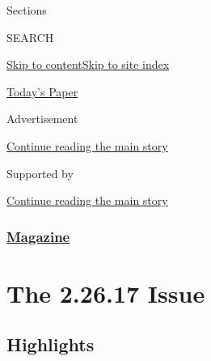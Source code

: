 Sections

SEARCH

\protect\hyperlink{site-content}{Skip to
content}\protect\hyperlink{site-index}{Skip to site index}

\href{https://myaccount.nytimes3xbfgragh.onion/auth/login?response_type=cookie\&client_id=vi}{}

\href{https://www.nytimes3xbfgragh.onion/section/todayspaper}{Today's
Paper}

Advertisement

\protect\hyperlink{after-top}{Continue reading the main story}

Supported by

\protect\hyperlink{after-sponsor}{Continue reading the main story}

\hypertarget{magazine}{%
\subsubsection{\texorpdfstring{\href{/section/magazine}{Magazine}}{Magazine}}\label{magazine}}

\hypertarget{the-22617-issue}{%
\section{The 2.26.17 Issue}\label{the-22617-issue}}

\hypertarget{highlights}{%
\subsection{Highlights}\label{highlights}}

